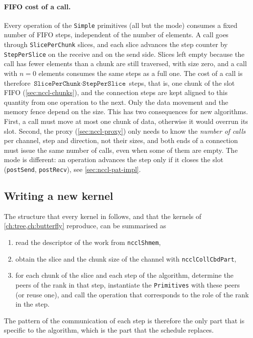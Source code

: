 \paragraph{FIFO cost of a call.}\label{sec:nccl-fifo-cost}
Every operation of the \texttt{Simple} primitives (all but the \pat{} mode) consumes a fixed number of FIFO steps, independent of the number of elements.
A call goes through \texttt{SlicePerChunk} slices, and each slice advances the step counter by \texttt{StepPerSlice} on the receive and on the send side. Slices left empty because the call has fewer elements than a chunk are still traversed, with size zero, and a call with $n=0$ elements consumes the same steps as a full one.
The cost of a call is therefore $\texttt{SlicePerChunk}\cdot\texttt{StepPerSlice}$ steps, that is, one chunk of the slot FIFO (\cref{sec:nccl-chunks}), and the connection steps are kept aligned to this quantity from one operation to the next.
Only the data movement and the memory fence depend on the size.
This has two consequences for new algorithms.
First, a call must move at most one chunk of data, otherwise it would overrun its slot.
Second, the proxy (\cref{sec:nccl-proxy}) only needs to know the \emph{number of calls} per channel, step and direction, not their sizes, and both ends of a connection must issue the same number of calls, even when some of them are empty.
The \pat{} mode is different: an operation advances the step only if it closes the slot (\texttt{postSend}, \texttt{postRecv}), see \cref{sec:nccl-pat-impl}.

\subsection{Writing a new kernel}

The structure that every kernel in \nccl{} follows, and that the \bine{} kernels of \cref{ch:tree,ch:butterfly} reproduce, can be summarised as
\begin{enumerate}
  \item read the descriptor of the work from \texttt{ncclShmem},
  \item obtain the slice and the chunk size of the channel with \texttt{ncclCollCbdPart},
  \item for each chunk of the slice and each step of the algorithm, determine the peers of the rank in that step, instantiate the \texttt{Primitives} with these peers (or reuse one), and call the operation that corresponds to the role of the rank in the step.
\end{enumerate}
The pattern of the communication of each step is therefore the only part that is specific to the algorithm, which is the part that the \bine{} schedule replaces.

